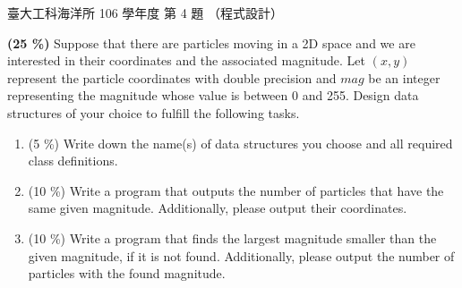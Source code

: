 \begin{pastexam}[label={px:ntu-106-esoe-ds-04}]{臺大工科海洋所 106 學年度 第 4 題}
（程式設計）

\textbf{(25 \%)} Suppose that there are particles moving in a 2D space and we are interested in
their coordinates and the associated magnitude. Let $(x,y)$ represent the particle coordinates
with double precision and $mag$ be an integer representing the magnitude whose value is between
0 and 255. Design data structures of your choice to fulfill the following tasks.
\begin{enumerate}[label=\alph*.]
\item (5 \%) Write down the name(s) of data structures you choose and all required class
definitions.
\item (10 \%) Write a program that outputs the number of particles that have the same given
magnitude. Additionally, please output their coordinates.
\item (10 \%) Write a program that finds the largest magnitude smaller than the given magnitude,
if it is not found. Additionally, please output the number of particles with the found
magnitude.
\end{enumerate}
\end{pastexam}


